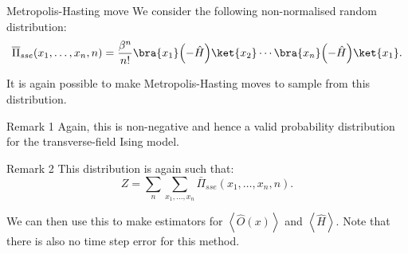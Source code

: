\documentclass[a4paper]{article}
\begin{document}
\begin{parag}{Metropolis-Hasting move}
    We consider the following non-normalised random distribution:
    \[\bar{\Pi}_{sse}\left(x_1, \ldots, x_n, n\right) = \frac{\beta^n}{n!} \bra{x_1} \left(-\hat{H}\right) \ket{x_2} \cdots \bra{x_n} \left(-\hat{H}\right) \ket{x_1}.\]

    It is again possible to make Metropolis-Hasting moves to sample from this distribution.

    \begin{subparag}{Remark 1}
        Again, this is non-negative and hence a valid probability distribution for the transverse-field Ising model.
    \end{subparag}

    \begin{subparag}{Remark 2}
        This distribution is again such that: 
        \[Z = \sum_{n} \sum_{x_1, \ldots, x_n} \bar{\Pi}_{sse}\left(x_1, \ldots, x_n, n\right).\]
    
        We can then use this to make estimators for $\left\langle \hat{O}\left(x\right) \right\rangle$ and $\left\langle \hat{H} \right\rangle$. Note that there is also no time step error for this method.
    \end{subparag}

\end{parag}
\end{document}
